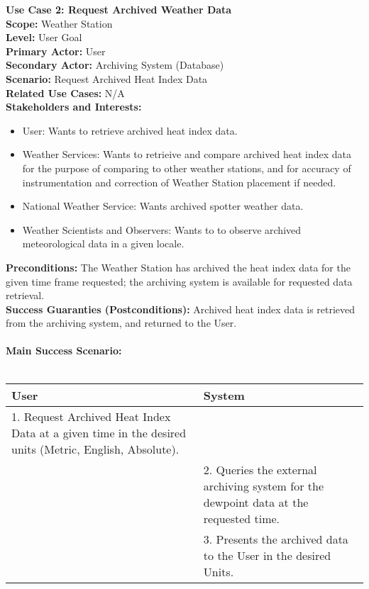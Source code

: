 \documentclass[letterpaper]{article}
\begin{document}
\noindent
\textbf{Use Case 2:  Request Archived Weather Data}\\
\textbf{Scope:  }Weather Station\\
\textbf{Level:  }User Goal\\
\textbf{Primary Actor:  }User\\
\textbf{Secondary Actor:  }Archiving System (Database)\\
\textbf{Scenario:  }Request Archived Heat Index Data\\
\textbf{Related Use Cases:  }N/A\\
\textbf{Stakeholders and Interests:  }
\begin{itemize}
\item User:  Wants to retrieve archived heat index data.
\item Weather Services:  Wants to retrieive and compare archived
heat index data for the purpose of comparing to other weather
stations, and for accuracy of instrumentation and correction of
Weather Station placement if needed.
\item National Weather Service:  Wants archived spotter weather data.
\item Weather Scientists and Observers:  Wants to to observe archived
meteorological data in a given locale.
\end{itemize}
\textbf{Preconditions:  }The Weather Station has archived the
heat index data for the given time frame requested; the
archiving system is available for requested data retrieval.\\
\textbf{Success Guaranties (Postconditions):  }Archived heat index
data is retrieved from the archiving system, and returned to the
User.\\\\
\textbf{Main Success Scenario:  }\\\\
\begin{tabular}{|p{6cm}|p{6cm}|}\hline
\textbf{User} & \textbf{System}\\\hline
1. Request Archived Heat Index Data at a given time in the
desired units (Metric, English, Absolute).&\\\hline
&2.  Queries the external archiving system for the dewpoint
data at the requested time.\\\hline
&3.  Presents the archived data to the User in the desired
Units.\\\hline
\end{tabular}\\\\
\end{document}
